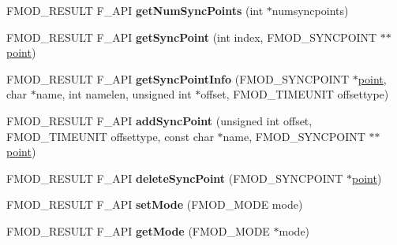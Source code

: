 \begin{DoxyCompactItemize}
\item 
\hypertarget{class_f_m_o_d_1_1_sound_a3a8c9fd2fb487a3b3a66952f09840fbf}{F\+M\+O\+D\+\_\+\+R\+E\+S\+U\+L\+T F\+\_\+\+A\+P\+I {\bfseries get\+Num\+Sync\+Points} (int $\ast$numsyncpoints)}\label{class_f_m_o_d_1_1_sound_a3a8c9fd2fb487a3b3a66952f09840fbf}

\item 
\hypertarget{class_f_m_o_d_1_1_sound_ab091d9a05e5f30f7a3ffbe1503335d32}{F\+M\+O\+D\+\_\+\+R\+E\+S\+U\+L\+T F\+\_\+\+A\+P\+I {\bfseries get\+Sync\+Point} (int index, F\+M\+O\+D\+\_\+\+S\+Y\+N\+C\+P\+O\+I\+N\+T $\ast$$\ast$\hyperlink{structpoint}{point})}\label{class_f_m_o_d_1_1_sound_ab091d9a05e5f30f7a3ffbe1503335d32}

\item 
\hypertarget{class_f_m_o_d_1_1_sound_a99aa787828a6fa111ba2663a3c35b6e0}{F\+M\+O\+D\+\_\+\+R\+E\+S\+U\+L\+T F\+\_\+\+A\+P\+I {\bfseries get\+Sync\+Point\+Info} (F\+M\+O\+D\+\_\+\+S\+Y\+N\+C\+P\+O\+I\+N\+T $\ast$\hyperlink{structpoint}{point}, char $\ast$name, int namelen, unsigned int $\ast$offset, F\+M\+O\+D\+\_\+\+T\+I\+M\+E\+U\+N\+I\+T offsettype)}\label{class_f_m_o_d_1_1_sound_a99aa787828a6fa111ba2663a3c35b6e0}

\item 
\hypertarget{class_f_m_o_d_1_1_sound_abb46f258c1ac4563f20b17a4647b0dc0}{F\+M\+O\+D\+\_\+\+R\+E\+S\+U\+L\+T F\+\_\+\+A\+P\+I {\bfseries add\+Sync\+Point} (unsigned int offset, F\+M\+O\+D\+\_\+\+T\+I\+M\+E\+U\+N\+I\+T offsettype, const char $\ast$name, F\+M\+O\+D\+\_\+\+S\+Y\+N\+C\+P\+O\+I\+N\+T $\ast$$\ast$\hyperlink{structpoint}{point})}\label{class_f_m_o_d_1_1_sound_abb46f258c1ac4563f20b17a4647b0dc0}

\item 
\hypertarget{class_f_m_o_d_1_1_sound_a21e86318ac39e576111e642b57db4187}{F\+M\+O\+D\+\_\+\+R\+E\+S\+U\+L\+T F\+\_\+\+A\+P\+I {\bfseries delete\+Sync\+Point} (F\+M\+O\+D\+\_\+\+S\+Y\+N\+C\+P\+O\+I\+N\+T $\ast$\hyperlink{structpoint}{point})}\label{class_f_m_o_d_1_1_sound_a21e86318ac39e576111e642b57db4187}

\item 
\hypertarget{class_f_m_o_d_1_1_sound_a8410551349a26de45abe6a931ea6965a}{F\+M\+O\+D\+\_\+\+R\+E\+S\+U\+L\+T F\+\_\+\+A\+P\+I {\bfseries set\+Mode} (F\+M\+O\+D\+\_\+\+M\+O\+D\+E mode)}\label{class_f_m_o_d_1_1_sound_a8410551349a26de45abe6a931ea6965a}

\item 
\hypertarget{class_f_m_o_d_1_1_sound_ae8bfe6364a2283c43c21f03d43daafe5}{F\+M\+O\+D\+\_\+\+R\+E\+S\+U\+L\+T F\+\_\+\+A\+P\+I {\bfseries get\+Mode} (F\+M\+O\+D\+\_\+\+M\+O\+D\+E $\ast$mode)}\label{class_f_m_o_d_1_1_sound_ae8bfe6364a2283c43c21f03d43daafe5}


\end{DoxyCompactItemize}
